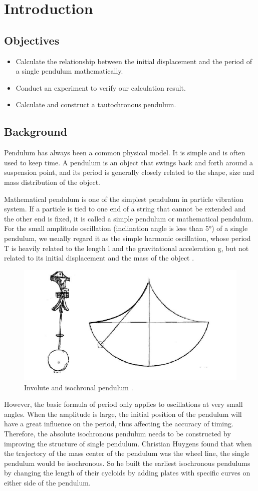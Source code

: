 \documentclass[12pt]{report}
\begin{document}
\section{Introduction}
\subsection*{Objectives}
\begin{itemize}
    \item{Calculate the relationship between the initial displacement and the period of a single pendulum mathematically.}
    \item{Conduct an experiment to verify our calculation result.}
    \item{Calculate and construct a tautochronous pendulum.}
\end{itemize}
\subsection*{Background}
Pendulum has always been a common physical model. It is simple and is often used to keep time. A pendulum is an object that swings back and forth around a suspension point, and its period is generally closely related to the shape, size and mass distribution of the object.

Mathematical pendulum is one of the simplest pendulum in particle vibration system. If a particle is tied to one end of a string that cannot be extended and the other end is fixed, it is called a simple pendulum or mathematical pendulum. For the small amplitude oscillation (inclination angle is less than 5°) of a single pendulum, we usually regard it as the simple harmonic oscillation, whose period T is heavily related to the length l and the gravitational acceleration g, but not related to its initial displacement and the mass of the object \cite{Arnold1990}.
\begin{figure}[H]
    \centering
    \includegraphics[width=0.8\linewidth]{1.png}
    \caption{Involute and isochronal pendulum \cite{Wu2012}.}
\end{figure}
However, the basic formula of period only applies to oscillations at very small angles. When the amplitude is large, the initial position of the pendulum will have a great influence on the period, thus affecting the accuracy of timing. Therefore, the absolute isochronous pendulum needs to be constructed by improving the structure of single pendulum. Christian Huygens found that when the trajectory of the mass center of the pendulum was the wheel line, the single pendulum would be isochronous. So he built the earliest isochronous pendulums by changing the length of their cycloids by adding plates with specific curves on either side of the pendulum.
\end{document}

